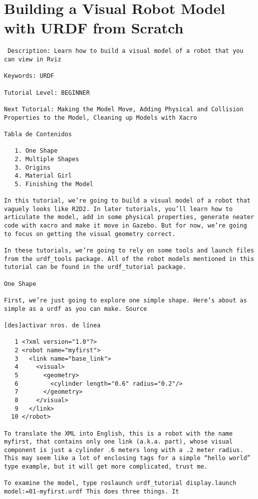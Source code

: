 \newcommand{\tutorialPath}{tutorial_1}


\chapter*{Building a Visual Robot Model with URDF from Scratch}

\begin{verbatim}
 Description: Learn how to build a visual model of a robot that you can view in Rviz

Keywords: URDF

Tutorial Level: BEGINNER

Next Tutorial: Making the Model Move, Adding Physical and Collision Properties to the Model, Cleaning up Models with Xacro

Tabla de Contenidos

   1. One Shape
   2. Multiple Shapes
   3. Origins
   4. Material Girl
   5. Finishing the Model

In this tutorial, we’re going to build a visual model of a robot that vaguely looks like R2D2. In later tutorials, you’ll learn how to articulate the model, add in some physical properties, generate neater code with xacro and make it move in Gazebo. But for now, we’re going to focus on getting the visual geometry correct.

In these tutorials, we’re going to rely on some tools and launch files from the urdf_tools package. All of the robot models mentioned in this tutorial can be found in the urdf_tutorial package.

One Shape

First, we’re just going to explore one simple shape. Here’s about as simple as a urdf as you can make. Source

[des]activar nros. de línea

   1 <?xml version="1.0"?>
   2 <robot name="myfirst">
   3   <link name="base_link">
   4     <visual>
   5       <geometry>
   6         <cylinder length="0.6" radius="0.2"/>
   7       </geometry>
   8     </visual>
   9   </link>
  10 </robot>

To translate the XML into English, this is a robot with the name myfirst, that contains only one link (a.k.a. part), whose visual component is just a cylinder .6 meters long with a .2 meter radius. This may seem like a lot of enclosing tags for a simple “hello world” type example, but it will get more complicated, trust me.

To examine the model, type roslaunch urdf_tutorial display.launch model:=01-myfirst.urdf This does three things. It


\end{verbatim}
